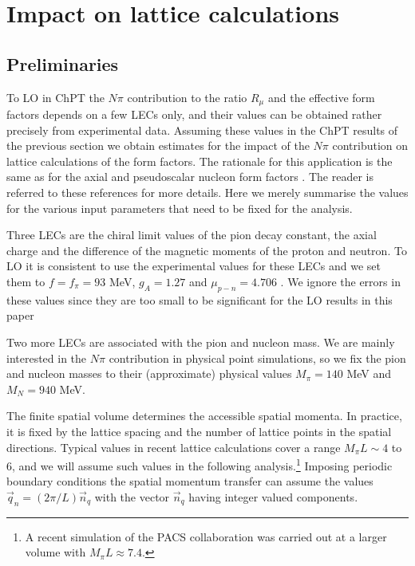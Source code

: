 \documentclass[11pt,prd,aps,showpacs,eqsecnum,floatfix,nofootinbib,preprint,tightenlines]{revtex4}
\begin{document}
%
\section{Impact on lattice calculations}\label{sect:impact}
%

\subsection{Preliminaries}

To LO in ChPT the $N\pi$ contribution to the ratio $R_{\mu}$ and the effective form factors depends on a few LECs only, and their values can be obtained rather precisely from experimental data. Assuming these values in the ChPT results of the previous section we obtain estimates for the impact of the $N\pi$ contribution on lattice calculations of the form factors. 
The rationale for this application is the same as for the axial and pseudoscalar nucleon form factors  \cite{Bar:2018xyi,Bar:2019gfx}. The reader is referred to these references for more details. Here we merely summarise the values for the various input parameters that need to be fixed for the analysis.   

Three LECs are the chiral limit values of the pion decay constant, the axial charge and the difference of the magnetic moments of the proton and neutron.  To LO it is consistent to use the experimental values for these LECs and we set them to $f=f_{\pi}= 93$ MeV, $g_A=1.27$ and $\mu_{p-n} =4.706$ \cite{Tanabashi:2018oca}. We ignore the errors in these values since they are too small to be significant for the LO results in this paper 

Two more LECs are associated with the pion and nucleon mass. We are mainly interested in the $N\pi$ contribution in physical point simulations, so we fix the pion and nucleon masses to their (approximate) physical values $M_{\pi}=140$ MeV and $M_N=940$ MeV. 

The finite spatial volume determines the accessible spatial momenta. In practice, it is fixed by the lattice spacing and the number of lattice points in the spatial directions. Typical values in recent lattice calculations cover a range $M_{\pi}L \sim 4$ to 6, and we will assume such values in the following analysis.\footnote{A recent simulation of the PACS collaboration \cite{Shintani:2018ozy} was carried out at a larger volume with $M_{\pi}L \approx 7.4$.}  Imposing periodic boundary conditions the spatial momentum transfer can assume the values
$\vec{q}_n=(2\pi/L)\vec{n}_q$
with the vector $\vec{n}_q$ having integer valued components. 
\end{document}
